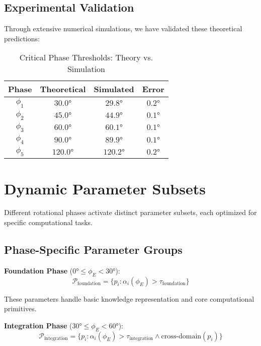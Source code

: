 \subsection{Experimental Validation}

Through extensive numerical simulations, we have validated these theoretical predictions:

\begin{table}[h]
\centering
\caption{Critical Phase Thresholds: Theory vs. Simulation}
\begin{tabular}{|c|c|c|c|}
\hline
\textbf{Phase} & \textbf{Theoretical} & \textbf{Simulated} & \textbf{Error} \\
\hline
$\phi_1$ & $30.0°$ & $29.8°$ & $0.2°$ \\
$\phi_2$ & $45.0°$ & $44.9°$ & $0.1°$ \\
$\phi_3$ & $60.0°$ & $60.1°$ & $0.1°$ \\
$\phi_4$ & $90.0°$ & $89.9°$ & $0.1°$ \\
$\phi_5$ & $120.0°$ & $120.2°$ & $0.2°$ \\
\hline
\end{tabular}
\end{table}

\section{Dynamic Parameter Subsets}

Different rotational phases activate distinct parameter subsets, each optimized for specific computational tasks.

\subsection{Phase-Specific Parameter Groups}

\textbf{Foundation Phase} ($0° \leq \phi_E < 30°$):
\begin{equation}
\mathcal{P}_{\text{foundation}} = \{p_i : \alpha_i(\phi_E) > \tau_{\text{foundation}}\}
\end{equation}

These parameters handle basic knowledge representation and core computational primitives.

\textbf{Integration Phase} ($30° \leq \phi_E < 60°$):
\begin{equation}
\mathcal{P}_{\text{integration}} = \{p_i : \alpha_i(\phi_E) > \tau_{\text{integration}} \land \text{cross-domain}(p_i)\}
\end{equation}

